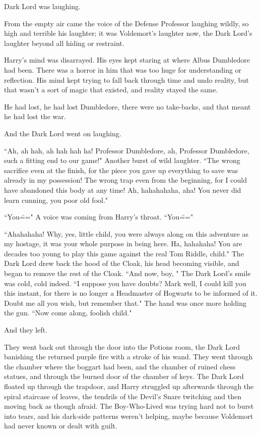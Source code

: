 
 Dark Lord was laughing.

\hplettrineextrapara
From the empty air came the voice of the Defense Professor laughing wildly, so high and terrible his laughter; it was Voldemort's laughter now, the Dark Lord's laughter beyond all hiding or restraint.

Harry's mind was disarrayed. His eyes kept staring at where Albus Dumbledore had been. There was a horror in him that was too huge for understanding or reflection. His mind kept trying to fall back through time and undo reality, but that wasn't a sort of magic that existed, and reality stayed the same.

He had lost, he had lost Dumbledore, there were no take-backs, and that meant he had lost the war.

And the Dark Lord went on laughing.

``Ah, ah hah, ah hah hah ha! Professor Dumbledore, ah, Professor Dumbledore, such a fitting end to our game!" Another burst of wild laughter. ``The wrong sacrifice even at the finish, for the piece you gave up everything to save was already in my possession! The wrong trap even from the beginning, for I could have abandoned this body at any time! Ah, hahahahaha, aha! You never did learn cunning, you poor old fool."

``You\===" A voice was coming from Harry's throat. ``You\==="

``Ahahahaha! Why, yes, little child, you were always along on this adventure as my hostage, it was your whole purpose in being here. Ha, hahahaha! You are decades too young to play this game against the real Tom Riddle, child." The Dark Lord drew back the hood of the Cloak, his head becoming visible, and began to remove the rest of the Cloak. ``And now, boy, " The Dark Lord's smile was cold, cold indeed. ``I suppose you have doubts? Mark well, I could kill you this instant, for there is no longer a Headmaster of Hogwarts to be informed of it. Doubt me all you wish, but remember that." The hand was once more holding the gun. ``Now come along, foolish child."

And they left.

They went back out through the door into the Potions room, the Dark Lord banishing the returned purple fire with a stroke of his wand. They went through the chamber where the boggart had been, and the chamber of ruined chess statues, and through the burned door of the chamber of keys. The Dark Lord floated up through the trapdoor, and Harry struggled up afterwards through the spiral staircase of leaves, the tendrils of the Devil's Snare twitching and then moving back as though afraid. The Boy-Who-Lived was trying hard not to burst into tears, and his dark-side patterns weren't helping, maybe because Voldemort had never known or dealt with guilt.

